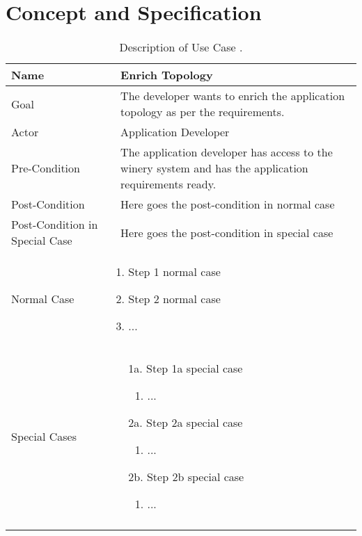 \chapter{Concept and Specification}
\label{chap:spec}

\newcommand{\usecase}[8]
{
{
\small \begin{longtable}{@{}p{.2\textwidth}p{.01\textwidth}p{.79\textwidth}@{}}
\toprule Name & & \textbf{#1} \\
\midrule Goal & & #2 \\
\midrule Actor & & #3 \\
\midrule Pre-Condition & & #4 \\
\midrule Post-Condition & & #5 \\
\midrule Post-Condition in Special Case & & #6 \\
\midrule Normal Case & \multicolumn{2}{p{.8\textwidth}}{\vspace*{-0.5cm}#7} \\
\midrule Special Cases &  \multicolumn{2}{p{.8\textwidth}}{\vspace*{-0.5cm}#8} \\
\bottomrule
\caption[Description of Use Case: #1]{Description of Use Case \term{#1}.}
\end{longtable}
}
\label{table:#1}
\clearpage
}


\usecase{Enrich Topology}
{The developer wants to enrich the application topology as per the requirements.}
{Application Developer}
{The application developer has access to the winery system and has the application requirements ready.}
{Here goes the post-condition in normal case}
{Here goes the post-condition in special case}
{\begin{enumerate}
	\item Step 1 normal case
	\item Step 2 normal case
	\item ...
\end{enumerate}}
{\begin{enumerate}
	\item[1a.] Step 1a special case
		\begin{enumerate}
			\item ...
		\end{enumerate}
	\item[2a.] Step 2a special case
		\begin{enumerate}
			\item ...
		\end{enumerate}
	\item[2b.] Step 2b special case
		\begin{enumerate}
			\item ...
		\end{enumerate}
\end{enumerate}}






